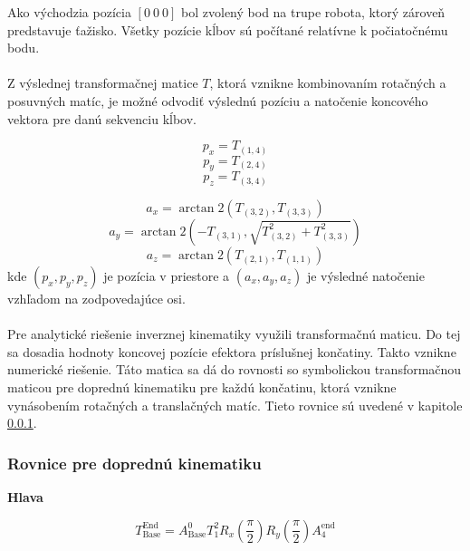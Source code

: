 Ako východzia pozícia $[0~0~0]$ bol zvolený bod na trupe robota, ktorý zároveň predstavuje ťažisko. Všetky pozície kĺbov sú počítané relatívne k počiatočnému bodu.
\\\\
Z výslednej transformačnej matice $T$, ktorá vznikne kombinovaním rotačných a posuvných matíc, je možné odvodiť výslednú pozíciu a natočenie koncového vektora pre danú sekvenciu kĺbov.


\begin{equation}
p_x = T_{\left(1,4\right)}
\end{equation}
\begin{equation}
p_y = T_{\left(2,4\right)}
\end{equation}
\begin{equation}
p_z = T_{\left(3,4\right)}
\end{equation}

\begin{equation}
a_x = \arctan2\left(T_{\left(3,2\right)},T_{\left(3,3\right)}\right)
\end{equation}
\begin{equation}
a_y = \arctan2\left(-T_{\left(3,1\right)},\sqrt{T_{\left(3,2\right)}^2 + T_{\left(3,3\right)}^2}\right)
\end{equation}
\begin{equation}
a_z = \arctan2\left(T_{\left(2,1\right)},T_{\left(1,1\right)}\right)
\end{equation}
kde $(p_x, p_y, p_z)$ je pozícia v priestore a $(a_x, a_y, a_z)$ je výsledné natočenie vzhľadom na zodpovedajúce osi.
\\\\
Pre analytické riešenie inverznej kinematiky využili transformačnú maticu. Do tej sa dosadia hodnoty koncovej pozície efektora príslušnej končatiny. Takto vznikne numerické riešenie. Táto matica sa dá do rovnosti so symbolickou transformačnou maticou pre doprednú kinematiku pre každú končatinu, ktorá vznikne vynásobením rotačných a translačných matíc. Tieto rovnice sú uvedené v kapitole \ref{sec_forward_kinematics_equations}.


\subsubsection{Rovnice pre doprednú kinematiku}\label{sec_forward_kinematics_equations}
\noindent
\textbf{Hlava}

\begin{equation}
T_{\text{Base}}^{\text{End}} = A_{\text{Base}}^{0} T_{1}^{2} R_{x}\left(\frac{\pi}{2}\right) R_{y}\left(\frac{\pi}{2}\right) A_{4}^{\text{end}}
\end{equation}

